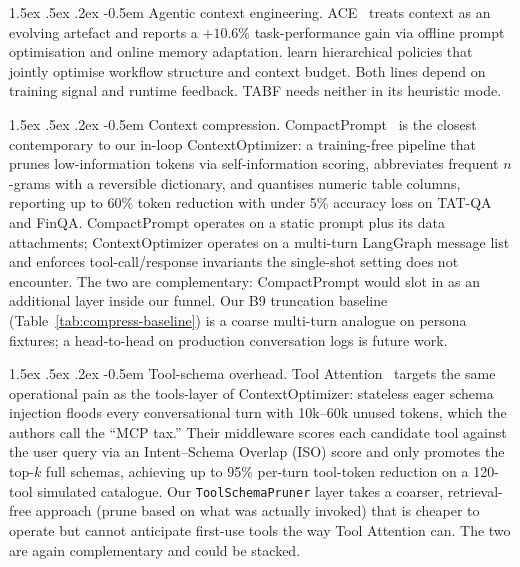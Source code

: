 \documentclass{article}
\makeatletter
\newcommand{\code}[1]{\texttt{\small #1}}
\renewcommand\paragraph{%
  \@startsection{paragraph}{4}{\z@}%
    {1.5ex \@plus.5ex \@minus.2ex}%
    {-0.5em}%
    {\normalfont\normalsize\bfseries}%
}
\makeatother
\begin{document}
\paragraph{Agentic context engineering.}
ACE~\citep{zhang2025ace} treats context as an evolving artefact and
reports a $+10.6\%$ task-performance gain via offline prompt optimisation
and online memory adaptation. \citet{taparia2026} learn hierarchical
policies that jointly optimise workflow structure and context budget.
Both lines depend on training signal and runtime feedback. TABF needs
neither in its heuristic mode.

\paragraph{Context compression.}
CompactPrompt~\citep{wang2025compactprompt} is the closest contemporary
to our in-loop ContextOptimizer: a training-free pipeline that prunes
low-information tokens via self-information scoring, abbreviates frequent
$n$-grams with a reversible dictionary, and quantises numeric table
columns, reporting up to 60\% token reduction with under 5\% accuracy
loss on TAT-QA and FinQA. CompactPrompt operates on a static prompt
plus its data attachments; ContextOptimizer operates on a multi-turn
LangGraph message list and enforces tool-call/response invariants the
single-shot setting does not encounter. The two are complementary:
CompactPrompt would slot in as an additional layer inside our funnel.
Our B9 truncation baseline (Table~\ref{tab:compress-baseline}) is a coarse
multi-turn analogue on persona fixtures; a head-to-head on production
conversation logs is future work.

\paragraph{Tool-schema overhead.}
Tool Attention~\citep{sadani2026} targets the same operational pain as
the tools-layer of ContextOptimizer: stateless eager schema injection
floods every conversational turn with 10k--60k unused tokens, which the
authors call the ``MCP tax.'' Their middleware scores each candidate
tool against the user query via an Intent--Schema Overlap (ISO) score
and only promotes the top-$k$ full schemas, achieving up to 95\% per-turn
tool-token reduction on a 120-tool simulated catalogue. Our
\code{ToolSchemaPruner} layer takes a coarser, retrieval-free approach
(prune based on what was actually invoked) that is cheaper to operate
but cannot anticipate first-use tools the way Tool Attention can. The
two are again complementary and could be stacked.
\end{document}
